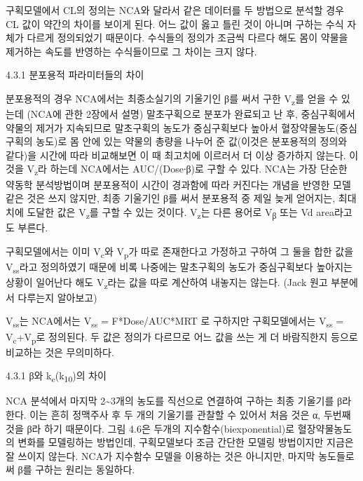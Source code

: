 \documentclass[
  11pt,
  krantz2, a4paper, twoside]{krantz}
\begin{document}
구획모델에서 CL의 정의는 NCA와 달라서 같은 데이터를 두 방법으로 분석할
경우 CL 값이 약간의 차이를 보이게 된다. 어느 값이 옳고 틀린 것이 아니며
구하는 수식 자체가 다르게 정의되었기 때문이다. 수식들의 정의가 조금씩
다르다 해도 몸이 약물을 제거하는 속도를 반영하는 수식들이므로 그 차이는
크지 않다.

4.3.1 분포용적 파라미터들의 차이

분포용적의 경우 NCA에서는 최종소실기의 기울기인 β를 써서 구한 V\textsubscript{z}를
얻을 수 있는데 (NCA에 관한 2장에서 설명) 말초구획으로 분포가 완료되고 난
후, 중심구획에서 약물의 제거가 지속되므로 말초구획의 농도가 중심구획보다
높아서 혈장약물농도(중심구획의 농도)로 몸 안에 있는 약물의 총량을 나누어
준 값(이것은 분포용적의 정의와 같다)을 시간에 따라 비교해보면 이 때
최고치에 이르러서 더 이상 증가하지 않는다. 이것을 V\textsubscript{z}라 하는데
NCA에서는 AUC/(Dose∙β)로 구할 수 있다. NCA는 가장 단순한 약동학
분석방법이며 분포용적이 시간이 경과함에 따라 커진다는 개념을 반영한 모델
같은 것은 쓰지 않지만, 최종 기울기인 β를 써서 분포용적 중 제일 늦게
얻어지는, 최대치에 도달한 값은 V\textsubscript{z}를 구할 수 있는 것이다. V\textsubscript{z}는 다른
용어로 V\textsubscript{β} 또는 Vd area라고도 부른다.

구획모델에서는 이미 V\textsubscript{c}와 V\textsubscript{p}가 따로 존재한다고 가정하고 구하여 그
둘을 합한 값을 V\textsubscript{ss}라고 정의하였기 때문에 비록 나중에는 말초구획의
농도가 중심구획보다 높아지는 상황이 일어난다 해도 V\textsubscript{z}라는 값을 따로
계산하여 내놓지는 않는다. (Jack 원고 부분에서 다루는지 알아보고)

V\textsubscript{ss}는 NCA에서는 V\textsubscript{ss} = F*Dose/AUC*MRT 로 구하지만 구획모델에서는
V\textsubscript{ss} = V\textsubscript{c}+V\textsubscript{p}로 정의된다. 두 값은 정의가 다르므로 어느 값을 쓰는 게
더 바람직한지 등으로 비교하는 것은 무의미하다.

4.3.1 β와 k\textsubscript{e}(k\textsubscript{10})의 차이

NCA 분석에서 마지막 2\textasciitilde3개의 농도를 직선으로 연결하여 구하는 최종
기울기를 β라 한다. 이는 흔히 정맥주사 후 두 개의 기울기를 관찰할 수
있어서 처음 것은 α, 두번째 것을 β라 하기 때문이다. 그림 4.6은 두개의
지수함수(biexponential)로 혈장약물농도의 변화를 모델링하는 방법인데,
구획모델보다 조금 간단한 모델링 방법이지만 지금은 잘 쓰이지 않는다.
NCA가 지수함수 모델을 이용하는 것은 아니지만, 마지막 농도들로써 β를
구하는 원리는 동일하다.
\end{document}
